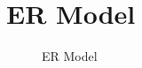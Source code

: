 \documentclass{article}
\begin{document}
\section{ER Model}
\begin{figure}[ph]
	\caption {ER Model}
	\label{ermodel}
\end{figure}
\end{document}
